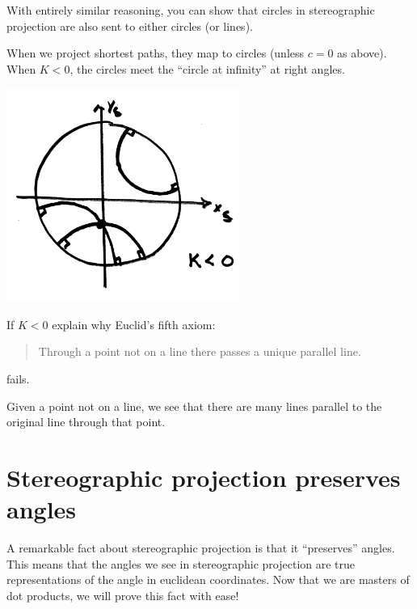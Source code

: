 \documentclass{ximera}
\begin{document}
\begin{remark}
  With entirely similar reasoning, you can show that circles in
  stereographic projection are also sent to either circles (or lines).
\end{remark}


When we project shortest paths, they map to circles (unless $c=0$ as
above). When $K<0$, the circles meet the ``circle at infinity'' at right angles. 

\begin{image}
\includegraphics[width=3in]{stereoLines.png}
\end{image}

\begin{problem}
  If $K<0$ explain why Euclid's fifth axiom:
  \begin{quote}
    Through a point not on a line there passes a unique parallel line.
  \end{quote}
  fails.
  \begin{freeResponse}
    Given a point not on a line, we see that there are many lines
    parallel to the original line through that point.
  \end{freeResponse}
\end{problem}







\section{Stereographic projection preserves angles}


A remarkable fact about stereographic projection is that it
``preserves'' angles. This means that the angles we see in
stereographic projection are true representations of the angle in
euclidean coordinates.  Now that we are masters of dot products, we
will prove this fact with ease!
\end{document}

